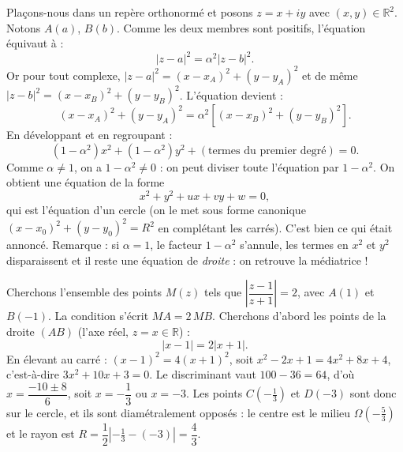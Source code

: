 \documentclass[11pt]{article}
\begin{document}
\begin{experience}
Plaçons-nous dans un repère orthonormé et posons $z = x + iy$ avec $(x,y) \in \mathbb{R}^2$. Notons $A(a)$, $B(b)$. Comme les deux membres sont positifs, l'équation équivaut à :
\[ |z - a|^2 = \alpha^2 |z - b|^2. \]
Or pour tout complexe, $|z - a|^2 = (x - x_A)^2 + (y - y_A)^2$ et de même $|z - b|^2 = (x - x_B)^2 + (y - y_B)^2$. L'équation devient :
\[ (x - x_A)^2 + (y - y_A)^2 = \alpha^2\left[(x - x_B)^2 + (y - y_B)^2\right]. \]
En développant et en regroupant :
\[ (1 - \alpha^2)x^2 + (1 - \alpha^2)y^2 + (\text{termes du premier degré}) = 0. \]
Comme $\alpha \neq 1$, on a $1 - \alpha^2 \neq 0$ : on peut diviser toute l'équation par $1 - \alpha^2$. On obtient une équation de la forme
\[ x^2 + y^2 + ux + vy + w = 0, \]
qui est l'équation d'un cercle (on le met sous forme canonique $(x - x_0)^2 + (y - y_0)^2 = R^2$ en complétant les carrés). C'est bien ce qui était annoncé. Remarque : si $\alpha = 1$, le facteur $1 - \alpha^2$ s'annule, les termes en $x^2$ et $y^2$ disparaissent et il reste une équation de \emph{droite} : on retrouve la médiatrice !
\end{experience}

\begin{exemplebox}[Le cercle d'Apollonius de $|(z-1)/(z+1)| = 2$]
Cherchons l'ensemble des points $M(z)$ tels que $\left|\dfrac{z-1}{z+1}\right| = 2$, avec $A(1)$ et $B(-1)$. La condition s'écrit $MA = 2\,MB$. Cherchons d'abord les points de la droite $(AB)$ (l'axe réel, $z = x \in \mathbb{R}$) :
\[ |x - 1| = 2|x + 1|. \]
En élevant au carré : $(x-1)^2 = 4(x+1)^2$, soit $x^2 - 2x + 1 = 4x^2 + 8x + 4$, c'est-à-dire $3x^2 + 10x + 3 = 0$. Le discriminant vaut $100 - 36 = 64$, d'où $x = \dfrac{-10 \pm 8}{6}$, soit $x = -\dfrac{1}{3}$ ou $x = -3$. Les points $C\left(-\tfrac{1}{3}\right)$ et $D(-3)$ sont donc sur le cercle, et ils sont diamétralement opposés : le centre est le milieu $\Omega\left(-\tfrac{5}{3}\right)$ et le rayon est $R = \dfrac{1}{2}\left|-\tfrac{1}{3} - (-3)\right| = \dfrac{4}{3}$.
\end{exemplebox}
\end{document}
